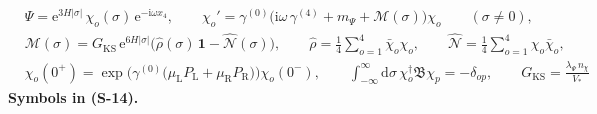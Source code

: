 \documentclass[
  10pt,
]{article}
\begin{document}
\[
\begin{aligned}
&\Psi = \mathrm{e}^{3H\lvert\sigma\rvert}\,\chi_o(\sigma)\,\mathrm{e}^{-\mathrm{i}\omega x_4},\qquad
 \chi_o' = \gamma^{(0)}\Big(\mathrm{i}\omega\,\gamma^{(4)} + m_\Psi + \mathcal{M}(\sigma)\Big)\chi_o\qquad(\sigma \ne 0),\\
&\mathcal{M}(\sigma) = G_{\mathrm{KS}}\,\mathrm{e}^{6H\lvert\sigma\rvert}\Big(\hat\rho(\sigma)\,\mathbf{1} - \hat{\mathcal{N}}(\sigma)\Big),\qquad
 \hat\rho = \frac14\sum_{o=1}^{4}\bar\chi_o\chi_o,\qquad \hat{\mathcal{N}} = \frac14\sum_{o=1}^{4}\chi_o\bar\chi_o,\\
&\chi_o(0^+) = \exp\Big(\gamma^{(0)}\big(\mu_{\mathrm{L}}P_{\mathrm{L}} + \mu_{\mathrm{R}}P_{\mathrm{R}}\big)\Big)\chi_o(0^-),\qquad
 \int_{-\infty}^{\infty}\mathrm{d}\sigma\,\chi_o^\dagger\mathfrak{B}\chi_p = -\delta_{op},\qquad G_{\mathrm{KS}} = \frac{\lambda_\Psi\,n_\chi}{V_*}
\end{aligned} \tag{S-14}
\] \textbf{Symbols in (S-14).}
\end{document}
